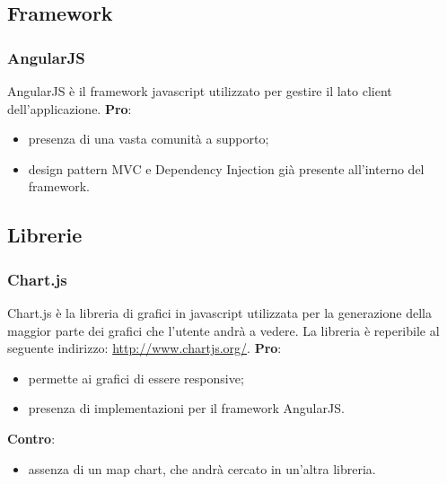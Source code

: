 
	\subsection{Framework} %
	\label{sub:framework}
		\subsubsection{AngularJS} %
		\label{ssub:angularjs}
		AngularJS è il framework javascript utilizzato per gestire il lato client dell'applicazione. \newline
		\textbf{Pro}:
			\begin{itemize}
				\item presenza di una vasta comunità a supporto;
				\item design pattern MVC e Dependency Injection già presente all'interno del framework.
			\end{itemize}
		\noindent



	\subsection{Librerie} %
	\label{sub:librerie}
		\subsubsection{Chart.js} %
		\label{ssub:chartsjs}
		Chart.js è la libreria di grafici in javascript utilizzata per la generazione della maggior parte dei grafici che l'utente andrà a vedere. La libreria è reperibile al seguente indirizzo: \url{http://www.chartjs.org/}. \newline
		\textbf{Pro}:
			\begin{itemize}
				\item permette ai grafici di essere responsive;
				\item presenza di implementazioni per il framework AngularJS.
			\end{itemize}
		\noindent
		\newline
		\textbf{Contro}:
			\begin{itemize}
				\item assenza di un map chart, che andrà cercato in un'altra libreria.
			\end{itemize}
			\noindent
		
